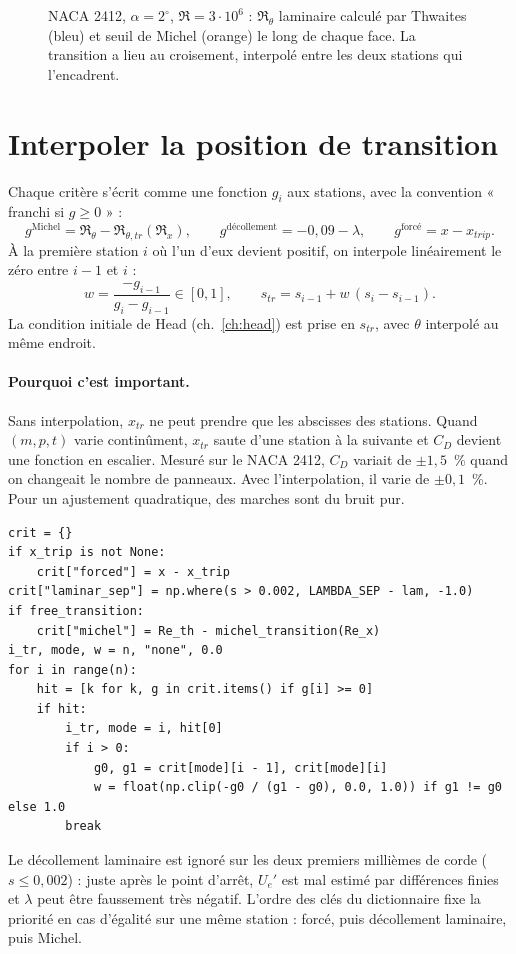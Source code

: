 \begin{figure}[htbp]
\centering

\caption{NACA 2412, $\alpha=2^\circ$, $\Re=3\cdot10^6$ : $\Re_\theta$ laminaire calculé par Thwaites (bleu) et seuil de Michel (orange) le long de chaque face. La transition a lieu au croisement, interpolé entre les deux stations qui l'encadrent.}\label{fig:michel}
\end{figure}

\section{Interpoler la position de transition}
Chaque critère s'écrit comme une fonction $g_i$ aux stations, avec la convention « franchi si $g\ge0$ » :
\[
g^{\text{Michel}}=\Re_\theta-\Re_{\theta,tr}(\Re_x),\qquad g^{\text{décollement}}=-0{,}09-\lambda,\qquad g^{\text{forcé}}=x-x_{trip}.
\]
À la première station $i$ où l'un d'eux devient positif, on interpole linéairement le zéro entre $i-1$ et $i$ :
\[
w=\frac{-g_{i-1}}{g_i-g_{i-1}}\in[0,1],\qquad s_{tr}=s_{i-1}+w\,(s_i-s_{i-1}).
\]
La condition initiale de Head (ch.~\ref{ch:head}) est prise en $s_{tr}$, avec $\theta$ interpolé au même endroit.

\paragraph{Pourquoi c'est important.} Sans interpolation, $x_{tr}$ ne peut prendre que les abscisses des stations. Quand $(m,p,t)$ varie continûment, $x_{tr}$ saute d'une station à la suivante et $C_D$ devient une fonction en escalier. Mesuré sur le NACA 2412, $C_D$ variait de $\pm1{,}5$~\% quand on changeait le nombre de panneaux. Avec l'interpolation, il varie de $\pm0{,}1$~\%. Pour un ajustement quadratique, des marches sont du bruit pur.

\begin{codebox}
\begin{lstlisting}
crit = {}
if x_trip is not None:
    crit["forced"] = x - x_trip
crit["laminar_sep"] = np.where(s > 0.002, LAMBDA_SEP - lam, -1.0)
if free_transition:
    crit["michel"] = Re_th - michel_transition(Re_x)
i_tr, mode, w = n, "none", 0.0
for i in range(n):
    hit = [k for k, g in crit.items() if g[i] >= 0]
    if hit:
        i_tr, mode = i, hit[0]
        if i > 0:
            g0, g1 = crit[mode][i - 1], crit[mode][i]
            w = float(np.clip(-g0 / (g1 - g0), 0.0, 1.0)) if g1 != g0 else 1.0
        break
\end{lstlisting}
Le décollement laminaire est ignoré sur les deux premiers millièmes de corde ($s\le0{,}002$) : juste après le point d'arrêt, $U_e'$ est mal estimé par différences finies et $\lambda$ peut être faussement très négatif. L'ordre des clés du dictionnaire fixe la priorité en cas d'égalité sur une même station : forcé, puis décollement laminaire, puis Michel.
\end{codebox}


